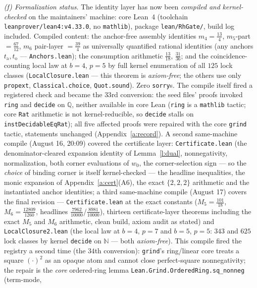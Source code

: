 \documentclass[11pt]{article}
\numberwithin{equation}{section}
\theoremstyle{definition}
\theoremstyle{remark}
\begin{document}
\emph{(f) Formalization status.}
The identity layer has now been \emph{compiled and
kernel-checked} on the maintainers' machine: core Lean~4
(toolchain \texttt{leanprover/lean4:v4.33.0}, no
\texttt{mathlib}), package \texttt{lean/RhGate/}, build log
included. Compiled content: the anchor-free assembly identities
$m_4=\tfrac{13}4$, $m_5$-part $=\tfrac{67}{12}$, $m_6$
pair-layer $=\tfrac{39}4$ as universally quantified rational
identities (any anchors $t_{\mathrm a},t_{\mathrm o}$ ---
\texttt{Anchors.lean}); the consumption arithmetic
$\tfrac{13}{18}$, $\tfrac{31}{36}$; and the coincidence-counting
local law at $b=4$, $p=5$ by full kernel enumeration of all
$125$ lock classes (\texttt{LocalClosure.lean} --- this theorem
is \emph{axiom-free}; the others use only
\texttt{propext}, \texttt{Classical.choice},
\texttt{Quot.sound}). Zero \texttt{sorry}s. The compile itself
fired a registered check and became the $33$rd conversion: the
seed files' proofs invoked \texttt{ring} and \texttt{decide}
on $\mathbb Q$, neither available in core Lean (\texttt{ring}
is a \texttt{mathlib} tactic; core \texttt{Rat} arithmetic is
not kernel-reducible, so \texttt{decide} stalls on
\texttt{instDecidableEqRat}); all five affected proofs were
repaired with the core \texttt{grind} tactic, statements
unchanged (Appendix~\ref{a:record}). A second same-machine compile (August 16, 20:09) covered the
certificate layer: \texttt{Certificate.lean} (the
denominator-cleared expansion identity of Lemma~\ref{l:dual},
nonnegativity, normalization, both corner evaluations of $w_0$,
the corner-selection sign --- so the \emph{choice} of
binding corner is itself kernel-checked --- the headline
inequalities, the monic expansion of Appendix~\ref{a:cert}(A6),
the exact $\{2,2,2\}$ arithmetic and the instantiated anchor
identities; a third same-machine compile (August 17) covers
the final revision --- \texttt{Certificate.lean} at the exact
constants ($M_5=\tfrac{101}{18}$, $M_6=\tfrac{12809}{1260}$,
headlines $\tfrac{7962}{10000}$/$\tfrac{8981}{10000}$),
thirteen certificate-layer theorems including the exact $M_5$
and $M_6$ arithmetic, clean build, axiom audit as stated) and
\texttt{LocalClosure2.lean} (the local law at $b=4$, $p=7$ and
$b=5$, $p=5$: $343$ and $625$ lock classes by kernel
\texttt{decide} on $\mathbb N$ --- both \emph{axiom-free}).
This compile fired the registry a second time (the $34$th
conversion): \texttt{grind}'s ring/linear core treats a square
$(\cdot)^2$ as an opaque atom and cannot close perfect-square
nonnegativity; the repair is the \emph{core} ordered-ring lemma
\texttt{Lean.Grind.OrderedRing.sq\_nonneg} (term-mode,
\end{document}
